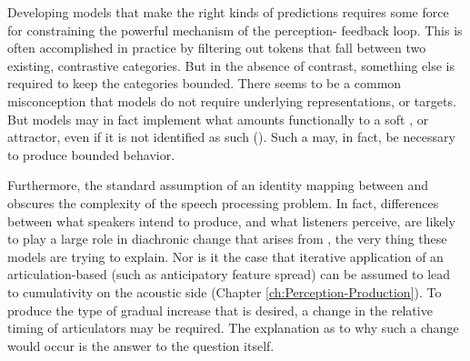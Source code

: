 Developing  models that make the right kinds of predictions
requires some force for constraining the powerful  mechanism
of the perception- feedback loop. This is often accomplished
in practice by filtering out tokens that fall between two existing,
contrastive categories. But in the absence of contrast, something
else is required to keep the categories bounded. There seems to be
a common misconception that  models do not require underlying
representations, or targets. But models may in fact implement what
amounts functionally to a soft , or attractor, even if it is
not identified as such (). Such
a  may, in fact, be necessary to produce bounded behavior.

Furthermore, the standard assumption of an identity mapping between
 and  obscures the complexity of the speech processing
problem. In fact, differences between what speakers intend to produce,
and what listeners perceive, are likely to play a large role in diachronic
change that arises from , the very thing these
models are trying to explain. Nor is it the case that iterative application
of an articulation-based  (such as anticipatory feature spread)
can be assumed to lead to cumulativity on the acoustic side (Chapter
\ref{ch:Perception-Production}). To produce the type of gradual
increase that is desired, a change in the relative timing of articulators
may be required. The explanation as to why such a change would occur
is the answer to the  question itself.

